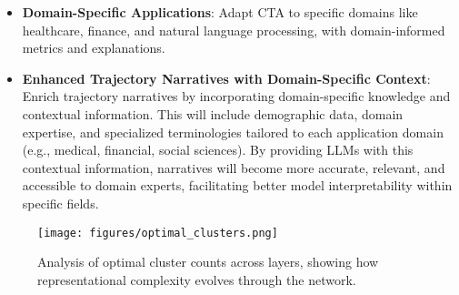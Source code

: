 \begin{itemize}
    \item \textbf{Domain-Specific Applications}: Adapt CTA to specific domains like healthcare, finance, and natural language processing, with domain-informed metrics and explanations.
    
    \item \textbf{Enhanced Trajectory Narratives with Domain-Specific Context}: Enrich trajectory narratives by incorporating domain-specific knowledge and contextual information. This will include demographic data, domain expertise, and specialized terminologies tailored to each application domain (e.g., medical, financial, social sciences). By providing LLMs with this contextual information, narratives will become more accurate, relevant, and accessible to domain experts, facilitating better model interpretability within specific fields.
\end{itemize}

\begin{figure}[ht]
    \centering
    \texttt{[image: figures/optimal\_clusters.png]}
    \caption{Analysis of optimal cluster counts across layers, showing how representational complexity evolves through the network.}
    \label{fig:optimal_clusters}
\end{figure}